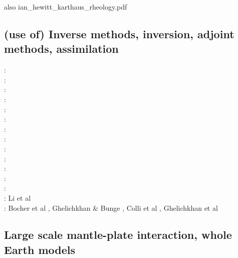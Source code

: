 also ian\_hewitt\_karthaus\_rheology.pdf

\subsection{(use of) Inverse methods, inversion, adjoint methods, assimilation}

\begin{scriptsize}
\nineteenninetyeight: \cite{cava98}\\
\nineteenninetynine: \cite{samb99}\cite{samb99b}\\
\twothousandone: \cite{bomo01}\cite{kapo01}\\
\twothousandtwo: \cite{shri02}\cite{burb02}\\
\twothousandthree: \cite{buht03}\\
\twothousandfour: \cite{isst04}\\
\twothousandseven: \cite{isks07}\\
\twothousandeight: \cite{splg08}\cite{ligu08}\\
\twothousandnine: \cite{wama09}\cite{splg09}\cite{sifg09}\\
\twothousandtwelve: \cite{naco12}\\
\twothousandfourteen: \cite{wosp14}\cite{hobo14}\cite{licl14}\\
\twothousandfifteen: \cite{wahg15}\cite{cobs15}\cite{vybu15}\\
\twothousandsixteen: \cite{ghbu16}\cite{bocf16}\cite{yagu16}\cite{baum16}\cite{pric16}\\
\twothousandseventeen: Li et al \cite{ligs17}\\
\twothousandeighteen: Bocher et al \cite{bofc18}, Ghelichkhan \& Bunge \cite{ghbu18}, Colli et al \cite{cogb18}, Ghelichkhan et al \cite{ghmc18}
\end{scriptsize}

\subsection{Large scale mantle-plate interaction, whole Earth models}

